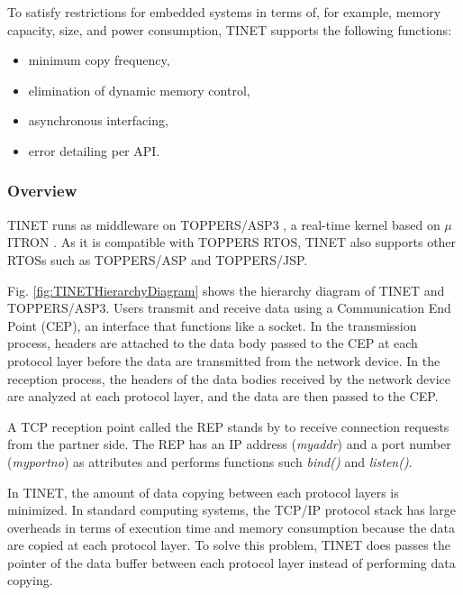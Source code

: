 \documentclass[conference]{IEEEtran/IEEEtran}
\begin{document}
To satisfy restrictions for embedded systems in terms of, for example, memory capacity, size, and power consumption, TINET supports the following functions:

\begin{itemize}
    \item minimum copy frequency,
    \item elimination of dynamic memory control,
    \item asynchronous interfacing,
    \item error detailing per API.
\end{itemize}

\subsubsection{Overview}

TINET runs as middleware on TOPPERS/ASP3 \cite{par:ASP3} \cite{url:ASP3}, a real-time kernel based on $\mu$ITRON \cite{par:microITRON}.
As it is compatible with TOPPERS RTOS, TINET also supports other RTOSs such as TOPPERS/ASP and TOPPERS/JSP.

Fig. \ref{fig:TINETHierarchyDiagram} shows the hierarchy diagram of TINET and TOPPERS/ASP3.
Users transmit and receive data using a Communication End Point (CEP), an interface that functions like a socket.
In the transmission process, headers are attached to the data body passed to the CEP at each protocol layer before the data are transmitted from the network device.
In the reception process, the headers of the data bodies received by the network device are analyzed at each protocol layer, and the data are then passed to the CEP.

A TCP reception point called the REP stands by to receive connection requests from the partner side.
The REP has an IP address ({\it myaddr}) and a port number ({\it myportno}) as attributes and performs functions such {\it bind()} and {\it listen()}.

In TINET, the amount of data copying between each protocol layers is minimized.
In standard computing systems, the TCP/IP protocol stack has large overheads in terms of execution time and memory consumption because the data are copied at each protocol layer.
To solve this problem, TINET does passes the pointer of the data buffer between each protocol layer instead of performing data copying.
\end{document}
